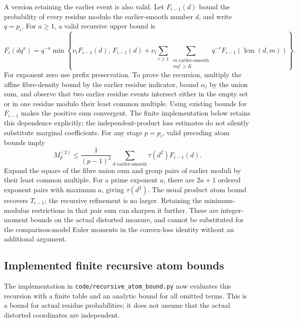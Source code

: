 \documentclass[11pt]{article}
\begin{document}
A version retaining the earlier event is also valid. Let $F_{i-1}(d)$
bound the probability of every residue modulo the earlier-smooth number
$d$, and write $q=p_i$. For $a\geq1$, a valid recursive upper bound is
\[
 F_i(dq^a)=q^{-a}\min\left\{\nu_iF_{i-1}(d),\,
 F_{i-1}(d)+\nu_i\sum_{r\geq1}\sum_{\substack{m\text{ earlier-smooth}\\mq^r\geq K}}
 q^{-r}F_{i-1}(\operatorname{lcm}(d,m))\right\}.
\]
For exponent zero use prefix preservation. To prove the recursion,
multiply the affine fibre-density bound by the earlier residue indicator,
bound $\alpha_i$ by the union sum, and observe that two earlier residue
events intersect either in the empty set or in one residue modulo their
least common multiple. Using existing bounds for $F_{i-1}$ makes the
positive sum convergent. The finite implementation below retains this
dependence explicitly; the independent-product loss estimates do not
silently substitute marginal coefficients.
For any stage $p=p_i$, valid preceding atom bounds imply
\[
 M_p^{(2)}\leq\frac1{(p-1)^2}
       \sum_{d\text{ earlier-smooth}}\tau(d^2)F_{i-1}(d).
\]
Expand the square of the fibre union sum and group pairs of earlier
moduli by their least common multiple. For a prime exponent $a$, there
are $2a+1$ ordered exponent pairs with maximum $a$, giving $\tau(d^2)$.
The usual product atom bound recovers $T_{i-1}$; the recursive refinement
is no larger. Retaining the minimum-modulus restrictions in that pair
sum can sharpen it further. These are integer-moment bounds on the actual
distorted measure, and cannot be substituted for the comparison-model
Euler moments in the convex-loss identity without an additional argument.

\subsection{Implemented finite recursive atom bounds}
\label{sec:finite-recursive-atoms}
The implementation in \texttt{code/recursive\_atom\_bound.py} now evaluates
this recursion with a finite table and an analytic bound for all omitted
terms. This is a bound for actual residue probabilities; it does not assume
that the actual distorted coordinates are independent.
\end{document}
